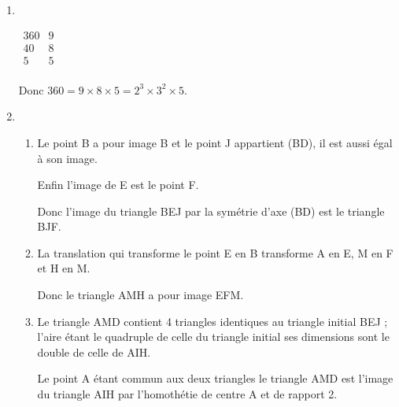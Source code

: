 
	
\begin{enumerate}
\item ~%

\begin{center}
$\begin{array}{r|l}
360&9\\
40&8\\
5&5\\
\end{array}$

Donc $360 = 9 \times 8 \times 5 = 2^3 \times 3^2 \times 5$.
\end{center}
		
\item %
	\begin{enumerate}
		\item %
Le point B a pour image B et le point J appartient  (BD), il est aussi égal à son image.
				
Enfin l'image de E est le point F.
				
Donc l'image du triangle BEJ par la symétrie d'axe (BD) est le triangle BJF.
				
\item %
La translation qui transforme le point E en B  transforme A en E, M en F et H en M.

Donc le triangle AMH a pour image EFM.
\item %
Le triangle AMD contient 4 triangles identiques au triangle initial BEJ ; l'aire étant le quadruple de celle du triangle initial ses dimensions sont le double de celle de AIH.

Le point A étant commun aux deux triangles le triangle AMD est l'image du triangle AIH par l'homothétie de centre A et de rapport 2.
			\end{enumerate}
		

\end{enumerate}
